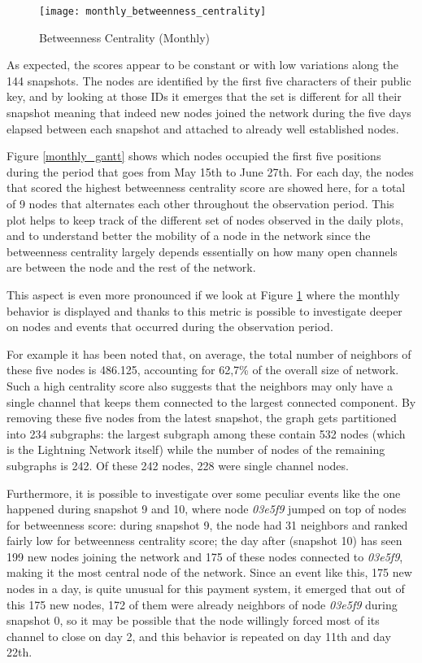 	\begin{figure}
		\centering
		\texttt{[image: monthly\_betweenness\_centrality]}
		\caption{Betweenness Centrality (Monthly)}
		\label{monthly_betweenness_centrality}
	\end{figure}

	As expected, the scores appear to be constant or with low variations along the 144 snapshots. The nodes are identified by the first five characters of their public key, and by looking at those IDs it emerges that the set is different for all their snapshot meaning that indeed new nodes joined the network during the five days elapsed between each snapshot and attached to already well established nodes. 
	
	Figure \ref{monthly_gantt} shows which nodes occupied the first five positions during the period that goes from May 15th to June 27th. For each day, the nodes that scored the highest betweenness centrality score are showed here, for a total of 9 nodes that alternates each other throughout the observation period. This plot helps to keep track of the different set of nodes observed in the daily plots, and to understand better the mobility of a node in the network since the betweenness centrality largely depends essentially on how many open channels are between the node and the rest of the network.
	
	This aspect is even more pronounced if we look at Figure \ref{monthly_betweenness_centrality} where the monthly behavior is displayed and thanks to this metric is possible to investigate deeper on nodes and events that occurred during the observation period. 
	
	For example it has been noted that, on average, the total number of neighbors of these five nodes is 486.125, accounting for 62,7\% of the overall size of network. Such a high centrality score also suggests that the neighbors may only have a single channel that keeps them connected to the largest connected component. By removing these five nodes from the latest snapshot, the graph gets partitioned into 234 subgraphs: the largest subgraph among these contain 532 nodes (which is the Lightning Network itself) while the number of nodes of the remaining subgraphs is 242. Of these 242 nodes, 228 were single channel nodes.

	
	Furthermore, it is possible to investigate over some peculiar events like the one happened during snapshot 9 and 10, where node \textit{03e5f9} jumped on top of nodes for betweenness score: during snapshot 9, the node had 31 neighbors and ranked fairly low for betweenness centrality score; the day after (snapshot 10) has seen 199 new nodes joining the network and 175 of these nodes connected to \textit{03e5f9}, making it the most central node of the network. Since an event like this, 175 new nodes in a day, is quite unusual for this payment system, it emerged that out of this 175 new nodes, 172 of them were already neighbors of node \textit{03e5f9} during snapshot 0, so it may be possible that the node willingly forced most of its channel to close on day 2, and this behavior is repeated on day 11th and day 22th.
	
